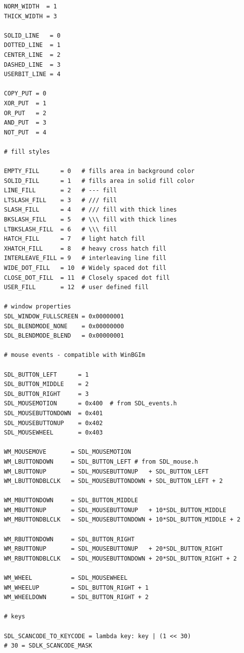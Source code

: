 \documentclass[a4paper,12pt]{article}
\begin{document}
\begin{footnotesize}
\begin{spacing}{0.8}
\begin{verbatim}
NORM_WIDTH  = 1
THICK_WIDTH = 3

SOLID_LINE   = 0
DOTTED_LINE  = 1
CENTER_LINE  = 2
DASHED_LINE  = 3
USERBIT_LINE = 4

COPY_PUT = 0
XOR_PUT  = 1
OR_PUT   = 2
AND_PUT  = 3
NOT_PUT  = 4

# fill styles

EMPTY_FILL      = 0   # fills area in background color
SOLID_FILL      = 1   # fills area in solid fill color
LINE_FILL       = 2   # --- fill
LTSLASH_FILL    = 3   # /// fill
SLASH_FILL      = 4   # /// fill with thick lines
BKSLASH_FILL    = 5   # \\\ fill with thick lines
LTBKSLASH_FILL  = 6   # \\\ fill
HATCH_FILL      = 7   # light hatch fill
XHATCH_FILL     = 8   # heavy cross hatch fill
INTERLEAVE_FILL = 9   # interleaving line fill
WIDE_DOT_FILL   = 10  # Widely spaced dot fill
CLOSE_DOT_FILL  = 11  # Closely spaced dot fill
USER_FILL       = 12  # user defined fill

# window properties
SDL_WINDOW_FULLSCREEN = 0x00000001
SDL_BLENDMODE_NONE    = 0x00000000
SDL_BLENDMODE_BLEND   = 0x00000001

# mouse events - compatible with WinBGIm

SDL_BUTTON_LEFT      = 1
SDL_BUTTON_MIDDLE    = 2
SDL_BUTTON_RIGHT     = 3
SDL_MOUSEMOTION      = 0x400  # from SDL_events.h
SDL_MOUSEBUTTONDOWN  = 0x401
SDL_MOUSEBUTTONUP    = 0x402
SDL_MOUSEWHEEL       = 0x403

WM_MOUSEMOVE       = SDL_MOUSEMOTION
WM_LBUTTONDOWN     = SDL_BUTTON_LEFT # from SDL_mouse.h
WM_LBUTTONUP       = SDL_MOUSEBUTTONUP   + SDL_BUTTON_LEFT
WM_LBUTTONDBLCLK   = SDL_MOUSEBUTTONDOWN + SDL_BUTTON_LEFT + 2

WM_MBUTTONDOWN     = SDL_BUTTON_MIDDLE
WM_MBUTTONUP       = SDL_MOUSEBUTTONUP   + 10*SDL_BUTTON_MIDDLE
WM_MBUTTONDBLCLK   = SDL_MOUSEBUTTONDOWN + 10*SDL_BUTTON_MIDDLE + 2

WM_RBUTTONDOWN     = SDL_BUTTON_RIGHT
WM_RBUTTONUP       = SDL_MOUSEBUTTONUP   + 20*SDL_BUTTON_RIGHT
WM_RBUTTONDBLCLK   = SDL_MOUSEBUTTONDOWN + 20*SDL_BUTTON_RIGHT + 2

WM_WHEEL           = SDL_MOUSEWHEEL
WM_WHEELUP         = SDL_BUTTON_RIGHT + 1
WM_WHEELDOWN       = SDL_BUTTON_RIGHT + 2

# keys

SDL_SCANCODE_TO_KEYCODE = lambda key: key | (1 << 30)
# 30 = SDLK_SCANCODE_MASK


\end{verbatim}
\end{spacing}
\end{footnotesize}
\end{document}
